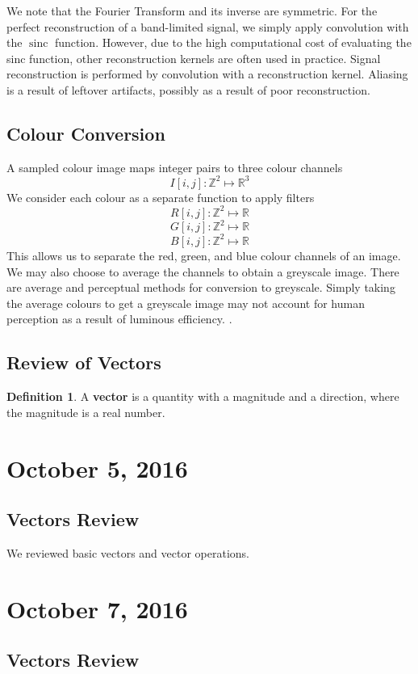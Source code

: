 \documentclass[11pt]{article}
\theoremstyle{plain} %
\theoremstyle{definition}
\newtheorem*{definition}{Definition} %
\theoremstyle{example}
\theoremstyle{remark}
\DeclareMathOperator{\sinc}{sinc}
\begin{document}
We note that the Fourier Transform and its inverse are symmetric. For the perfect reconstruction of a band-limited signal, we simply apply convolution with the $\sinc$ function. However, due to the high computational cost of evaluating the sinc function, other reconstruction kernels are often used in practice. Signal reconstruction is performed by convolution with a reconstruction kernel. Aliasing is a result of leftover artifacts, possibly as a result of poor reconstruction. 
\subsection{Colour Conversion}

A sampled colour image maps integer pairs to three colour channels
$$I[i,j]:\mathbb Z^2 \mapsto \mathbb R^3$$
We consider each colour as a separate function to apply filters
$$R[i,j]:\mathbb Z^2 \mapsto \mathbb R$$
$$G[i,j]:\mathbb Z^2 \mapsto \mathbb R$$
$$B[i,j]:\mathbb Z^2 \mapsto \mathbb R$$
This allows us to separate the red, green, and blue colour channels of an image. We may also choose to average the channels to obtain a greyscale image. There are average and perceptual methods for conversion to greyscale. Simply taking the average colours to get a greyscale image may not account for human perception as a result of luminous efficiency. . 

\subsection{Review of Vectors}

\begin{definition}
A \textbf{vector} is a quantity with a magnitude and a direction, where the magnitude is a real number. 
\end{definition}

\section{October 5, 2016}
\subsection{Vectors Review}

We reviewed basic vectors and vector operations.

\section{October 7, 2016}
\subsection{Vectors Review}
\end{document}

